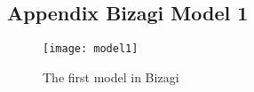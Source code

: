 \begin{landscape}
\section{Appendix Bizagi Model 1}\label{app:appendix_model1}
\begin{figure}[!ht]
	\texttt{[image: model1]}
	\caption{The first model in Bizagi}
	\label{fig:model1}
\end{figure}
\end{landscape}

\clearpage
